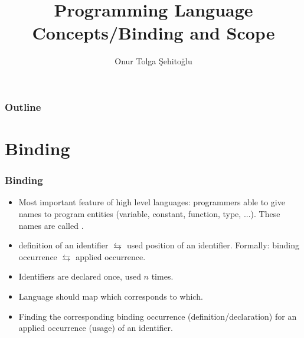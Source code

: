 \usepackage{etex}
\usepackage[utf8]{inputenc}
\usepackage{listings}
\usepackage{multicol}

\def\circtxt#1{$\mathalpha \bigcirc \mkern-13mu \mathtt #1$}

{
  \usepackage{fullpage}
  \usepackage{pgf}
  \usepackage{hyperref}
}

{

}


\title{Programming Language Concepts/Binding and Scope}
\author{Onur Tolga Şehitoğlu}
\subject{Binding and Scope}
\date{}


%
%
%
%

 \frame[plain]{\maketitle}
 \begin{frame}
 \frametitle{Outline}
 \begin{multicols}{2}
 \tableofcontents
 \end{multicols}
 \end{frame}
\section{Binding}
\begin{frame}
\frametitle{Binding}
\begin{itemize}[<+->]
\item Most important feature of high level languages: programmers able to
give names to program entities (variable, constant, function, type, ...).
These names are called .
\item definition of an identifier $\leftrightarrows$ used position of an
identifier. Formally:
binding occurrence $\leftrightarrows$ applied occurrence.
\item Identifiers are declared once, used $n$ times.
\item Language should map which corresponds to which.
\item {} Finding the corresponding binding occurrence
(definition/declaration) for an applied occurrence (usage) of an identifier.
\end{itemize}
\end{frame}

